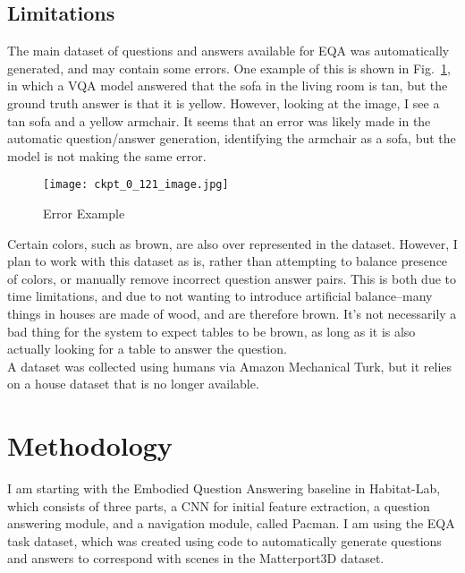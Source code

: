\documentclass{article}
\begin{document}
\subsection{Limitations}
The main dataset of questions and answers available for EQA was automatically generated, and may contain some errors. One example of this is shown in Fig.~\ref{fig:err_ex}, in which a VQA model answered that the sofa in the living room is tan, but the ground truth answer is that it is yellow. However, looking at the image, I see a tan sofa and a yellow armchair. It seems that an error was likely made in the automatic question/answer generation, identifying the armchair as a sofa, but the model is not making the same error. \\
\begin{figure}[h]
	\centering
	\texttt{[image: ckpt\_0\_121\_image.jpg]}
	\caption{Error Example}
	\label{fig:err_ex}
\end{figure}
Certain colors, such as brown, are also over represented in the dataset. However, I plan to work with this dataset as is, rather than attempting to balance presence of colors, or manually remove incorrect question answer pairs. This is both due to time limitations, and due to not wanting to introduce artificial balance--many things in houses are made of wood, and are therefore brown. It's not necessarily a bad thing for the system to expect tables to be brown, as long as it is also actually looking for a table to answer the question. \\
A dataset was collected using humans via Amazon Mechanical Turk, but it relies on a house dataset that is no longer available. \\
 

\section{Methodology}

I am starting with the Embodied Question Answering baseline in Habitat-Lab, which consists of three parts, a CNN for initial feature extraction, a question answering module, and a navigation module, called Pacman\cite{embodiedqa}. I am using the EQA task dataset, which was created using code to automatically generate questions and answers to correspond with scenes in the Matterport3D dataset\cite{matterport}. \\
\end{document}
